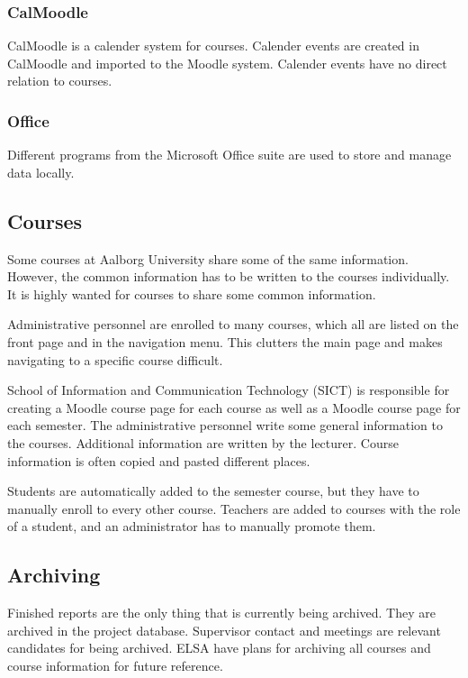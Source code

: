 \subsubsection*{CalMoodle}
CalMoodle is a calender system for courses.
Calender events are created in CalMoodle and imported to the Moodle system.
Calender events have no direct relation to courses.

\subsubsection*{Office}
Different programs from the Microsoft Office suite are used to store and manage data locally.

\subsection*{Courses}
Some courses at Aalborg University share some of the same information.
However, the common information has to be written to the courses individually.
It is highly wanted for courses to share some common information.

Administrative personnel are enrolled to many courses, which all are listed on the front page and in the navigation menu.
This clutters the main page and makes navigating to a specific course difficult.

School of Information and Communication Technology (SICT) is responsible for creating a Moodle course page for each course as well as a Moodle course page for each semester. 
The administrative personnel write some general information to the courses.
Additional information are written by the lecturer.
Course information is often copied and pasted different places.

Students are automatically added to the semester course, but they have to manually enroll to every other course.
Teachers are added to courses with the role of a student, and an administrator has to manually promote them.

\subsection*{Archiving}
Finished reports are the only thing that is currently being archived.
They are archived in the project database.
Supervisor contact and meetings are relevant candidates for being archived.
ELSA have plans for archiving all courses and course information for future reference.